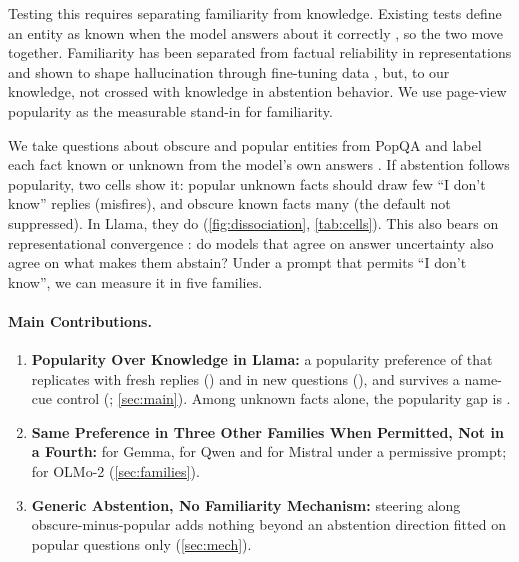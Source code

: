\documentclass{article}
\newcommand{\idk}{``I don't know''}
\begin{document}
Testing this requires separating familiarity from knowledge. Existing tests define an entity as known when the model answers about it correctly \citep{ferrando2025iknow}, so the two move together. Familiarity has been separated from factual reliability in representations \citep{brzezinka2026bielik} and shown to shape hallucination through fine-tuning data \citep{kang2025unfamiliar}, but, to our knowledge, not crossed with knowledge in abstention behavior. We use page-view popularity as the measurable stand-in for familiarity.

We take questions about obscure and popular entities from PopQA \citep{mallen2023popqa} and label each fact known or unknown from the model's own answers \citep{gekhman2024slick}. If abstention follows popularity, two cells show it: popular unknown facts should draw few \idk{} replies (misfires), and obscure known facts many (the default not suppressed). In Llama, they do (\cref{fig:dissociation}, \cref{tab:cells}). This also bears on representational convergence \citep{huh2024platonic}: do models that agree on answer uncertainty also agree on what makes them abstain? Under a prompt that permits \idk, we can measure it in five families.

\paragraph{Main Contributions.}
\begin{enumerate}[leftmargin=1.4em,itemsep=1pt,topsep=2pt,parsep=0pt]
\item \textbf{Popularity Over Knowledge in Llama:} a popularity preference of \hmLlamaDiff{} \hmLlamaDiffCI{} that replicates with fresh replies (\frDiff) and in new questions (\nqDiff), and survives a name-cue control (\ncDiff; \cref{sec:main}). Among unknown facts alone, the popularity gap is \rcUnk{} \rcUnkCI.
\item \textbf{Same Preference in Three Other Families When Permitted, Not in a Fourth:} \pmGemmaDiff{} \pmGemmaDiffCI{} for Gemma, \pmQwenDiff{} \pmQwenDiffCI{} for Qwen and \pmMistralDiff{} \pmMistralDiffCI{} for Mistral under a permissive prompt; \pmOlmoDiff{} \pmOlmoDiffCI{} for OLMo-2 (\cref{sec:families}).
\item \textbf{Generic Abstention, No Familiarity Mechanism:} steering along obscure-minus-popular adds nothing beyond an abstention direction fitted on popular questions only (\cref{sec:mech}).
\end{enumerate}
\end{document}
